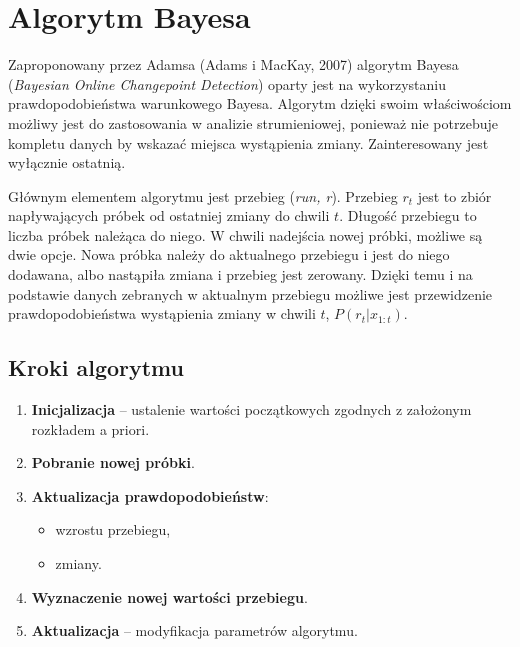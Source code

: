 \section{Algorytm Bayesa}
\label{sec:Bayes}
Zaproponowany przez Adamsa (Adams i MacKay, 2007) algorytm Bayesa (\textit{Bayesian Online Changepoint Detection})
oparty jest na wykorzystaniu prawdopodobieństwa warunkowego Bayesa.
Algorytm dzięki swoim właściwościom możliwy jest do zastosowania w analizie strumieniowej,
ponieważ nie potrzebuje kompletu danych by wskazać miejsca wystąpienia zmiany.
Zainteresowany jest wyłącznie ostatnią.

Głównym elementem algorytmu jest przebieg (\textit{run, r}).
Przebieg $r_t$ jest to zbiór napływających próbek od ostatniej zmiany do chwili $t$.
Długość przebiegu to liczba próbek należąca do niego.
W chwili nadejścia nowej próbki,
możliwe są dwie opcje.
Nowa próbka należy do aktualnego przebiegu i jest do niego dodawana,
albo nastąpiła zmiana i przebieg jest zerowany.
Dzięki temu i na podstawie danych zebranych w aktualnym przebiegu
możliwe jest przewidzenie prawdopodobieństwa wystąpienia zmiany w chwili $t$,
$P(r_t|x_{1:t})$.

\subsection*{Kroki algorytmu}
\begin{enumerate}
  \item \textbf{Inicjalizacja} -- ustalenie wartości początkowych zgodnych z założonym rozkładem a priori.
  \item \textbf{Pobranie nowej próbki}.
  \item \textbf{Aktualizacja prawdopodobieństw}:
    \begin{itemize}
      \item wzrostu przebiegu,
      \item zmiany.
    \end{itemize}
  \item \textbf{Wyznaczenie nowej wartości przebiegu}.
  \item \textbf{Aktualizacja} -- modyfikacja parametrów algorytmu.
\end{enumerate}
